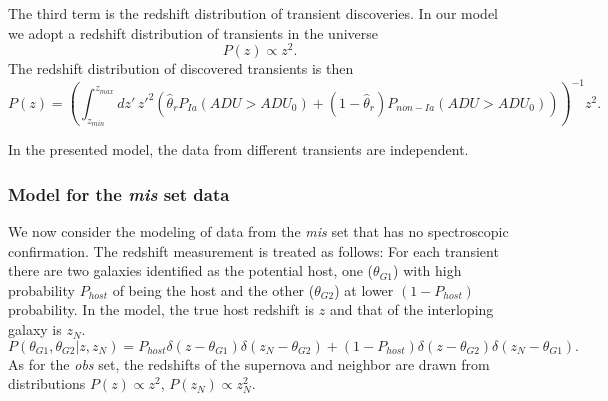 \documentclass[preprint]{aastex}
\begin{document}
The third term is the redshift distribution of transient discoveries.
In our model we adopt
a redshift distribution of transients in the universe
\begin{equation}
P(z) \propto z^2.
\end{equation}
The redshift distribution of discovered transients is then
\begin{equation}
P(z) = \left(\int_{z_{min}}^{z_{max}} dz'\, z'^2\left( 
\hat{\theta}_{r}P_{Ia}(\mathit{ADU} > \mathit{ADU}_0) + (1-\hat{\theta}_{r})P_{non-Ia}(\mathit{ADU} > \mathit{ADU}_0)
\right)\right)^{-1}z^2.
\end{equation}

In the presented model, the data from different transients are independent.

\subsubsection{Model for the {\it mis} set data}

We now consider the modeling of data from the  {\it mis}
set that has no spectroscopic confirmation.
The redshift measurement is treated as follows:
For each transient there are two galaxies identified as
the potential host, one ($\theta_{G1}$) with high probability $P_{host}$
of being the host and the other
($\theta_{G2}$) at lower $(1-P_{host})$ probability.
In the model, the
true host redshift is $z$ and that of the interloping galaxy is $z_N$.
\begin{equation}
P(\theta_{G1},\theta_{G2}|z, z_N) =
	P_{host}\delta(z-\theta_{G1})\delta(z_N-\theta_{G2}) +
	(1-P_{host}) \delta(z-\theta_{G2})\delta(z_N-\theta_{G1}).
\end{equation}
As for the {\it obs} set, the redshifts of the supernova
 and neighbor are drawn from distributions $P(z) \propto z^2$, $P(z_N) \propto z^2_N$.
\end{document}
